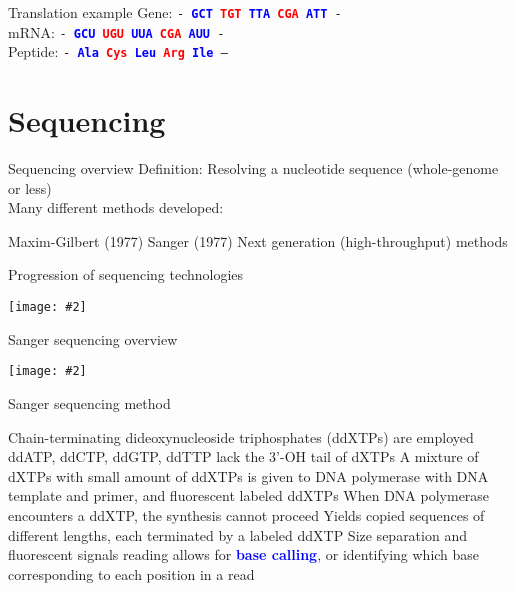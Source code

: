 \documentclass{beamer}
\renewcommand{\c}[1]{\begin{center}#1\end{center}}
\newcommand{\blu}[1]{\textcolor{blue}{\textbf{#1}}}
\newcommand{\red}[1]{\textcolor{red}{\textbf{#1}}}
\newcommand{\gr}[2][.95]{\c{\texttt{[image: \#2]}}}
\begin{document}
\begin{frame}{Translation example}
Gene: \hfill    \texttt{- \blu{GCT} \red{TGT} \blu{TTA} \red{CGA} \blu{ATT} -}\\
mRNA: \hfill    \texttt{- \blu{GCU} \red{UGU} \blu{UUA} \red{CGA} \blu{AUU} -}\\
Peptide: \hfill \texttt{- \blu{Ala} \red{Cys} \blu{Leu} \red{Arg} \blu{Ile} –}
\end{frame}

\section{Sequencing}

\begin{frame}{Sequencing overview}
Definition: Resolving a nucleotide sequence (whole-genome or less)\\
\bigskip
Many different methods developed:
\begin{outline}
    \1 Maxim-Gilbert (1977)
    \1 Sanger (1977)
    \1 Next generation (high-throughput) methods
\end{outline}
\end{frame}

\begin{frame}{Progression of sequencing technologies}
\gr{l1_figs/s16_sequencing_progression.png}
\end{frame}

\begin{frame}{Sanger sequencing overview}
\gr{l1_figs/s17_sanger.png}
\end{frame}

\begin{frame}{Sanger sequencing method}
\begin{outline}
    \1 Chain-terminating dideoxynucleoside triphosphates (ddXTPs) are employed
        \2 ddATP, ddCTP, ddGTP, ddTTP lack the 3’-OH tail of dXTPs 
    \1 A mixture of dXTPs with small amount of ddXTPs is given to DNA polymerase with DNA template and primer, and fluorescent labeled ddXTPs
    \1 When DNA polymerase encounters a ddXTP, the synthesis cannot proceed 
    \1 Yields copied sequences of different lengths, each terminated by a labeled ddXTP
    \1 Size separation and fluorescent signals reading allows for \blu{base calling}, or identifying which base corresponding to each position in a read
\end{outline}
\end{frame}
\end{document}
